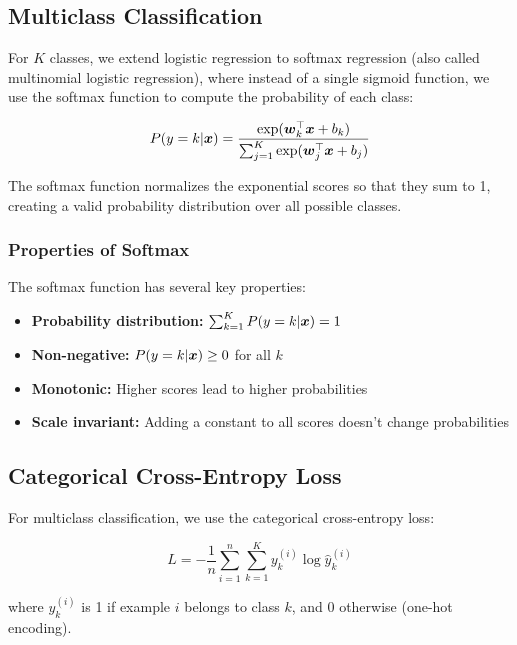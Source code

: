 \subsection{Multiclass Classification}

For $K$ classes, we extend logistic regression to softmax regression (also called multinomial logistic regression), where instead of a single sigmoid function, we use the softmax function to compute the probability of each class:

\begin{equation}
P(y=k|\boldsymbol{x}) = \frac{\exp(\boldsymbol{w}_k^\top \boldsymbol{x} + b_k)}{\sum_{j=1}^{K} \exp(\boldsymbol{w}_j^\top \boldsymbol{x} + b_j)}
\end{equation}

The softmax function normalizes the exponential scores so that they sum to 1, creating a valid probability distribution over all possible classes.

\subsubsection{Properties of Softmax}

The softmax function has several key properties:
\begin{itemize}
    \item \textbf{Probability distribution:} $\sum_{k=1}^{K} P(y=k|\boldsymbol{x}) = 1$
    \item \textbf{Non-negative:} $P(y=k|\boldsymbol{x}) \geq 0$ for all $k$
    \item \textbf{Monotonic:} Higher scores lead to higher probabilities
    \item \textbf{Scale invariant:} Adding a constant to all scores doesn't change probabilities
\end{itemize}

\subsection{Categorical Cross-Entropy Loss}

For multiclass classification, we use the categorical cross-entropy loss:

\begin{equation}
L = -\frac{1}{n} \sum_{i=1}^{n} \sum_{k=1}^{K} y_k^{(i)} \log \hat{y}_k^{(i)}
\end{equation}

where $y_k^{(i)}$ is 1 if example $i$ belongs to class $k$, and 0 otherwise (one-hot encoding).

